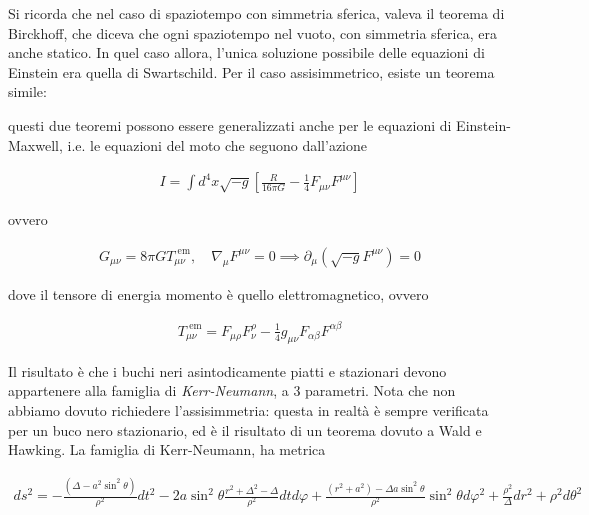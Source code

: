 \documentclass{report}
\begin{document}
Si ricorda che nel caso di spaziotempo con simmetria sferica, valeva il teorema di Birckhoff, che diceva che ogni spaziotempo nel vuoto, con simmetria sferica, era anche statico. In quel caso allora, l'unica soluzione possibile delle equazioni di Einstein era quella di Swartschild. Per il caso assisimmetrico, esiste un teorema simile: 


questi due teoremi possono essere generalizzati anche per le equazioni di Einstein-Maxwell, i.e. le equazioni del moto che seguono dall'azione 

\begin{align}
    I = \int d^4x \sqrt{-g}\left[\frac{R}{16\pi G} - \frac{1}{4}F_{\mu\nu}F^{\mu\nu} \right]
\end{align}

ovvero 

\begin{align}
    G_{\mu\nu} = 8\pi G T_{\mu\nu}^{\text{  em}}, \quad \nabla_\mu F^{\mu\nu} = 0 \implies \partial_\mu (\sqrt{-g}F^{\mu\nu}) = 0 
\end{align}

dove il tensore di energia momento è quello elettromagnetico, ovvero 

\begin{align}
    T_{\mu\nu}^{\text{  em}} = F_{\mu\rho}F^\rho_\nu - \frac{1}{4}g_{\mu\nu}F_{\alpha\beta}F^{\alpha\beta}
\end{align}

Il risultato è che i buchi neri asintodicamente piatti e stazionari devono appartenere alla famiglia di \emph{Kerr-Neumann}, a 3 parametri. Nota che non abbiamo dovuto richiedere l'assisimmetria: questa in realtà è sempre verificata per un buco nero stazionario, ed è il risultato di un teorema dovuto a Wald e Hawking. La famiglia di Kerr-Neumann, ha metrica

\begin{align}
    ds^2 = -\frac{(\Delta - a^2\sin^2\theta)}{\rho^2}dt^2 -2a\sin^2\theta \frac{r^2 + \Delta^2 - \Delta}{\rho^2}dtd\varphi + \frac{(r^2 + a^2)-\Delta a \sin^2\theta}{\rho^2}\sin^2\theta d\varphi^2 + \frac{\rho^2}{\Delta}dr^2 + \rho^2d\theta^2
\end{align}
\end{document}
